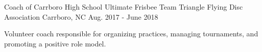 

\begin{cventries}

  \cventry
    {Coach of Carrboro High School Ultimate Frisbee Team} %
    {Triangle Flying Disc Association} %
    {Carrboro, NC} %
    {Aug. 2017 - June 2018} %
    {
      \begin{cvitems} %
        \item {Volunteer coach responsible for organizing practices, managing tournaments, and promoting a positive role model.}
      \end{cvitems}
    }

\end{cventries}
